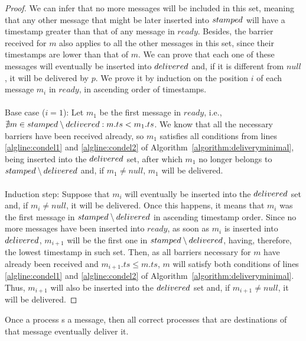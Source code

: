 \documentclass[times, 10pt]{article}
\begin{document}
\begin{proof}
We can infer that no more messages will be included in this set, meaning that any other message that might be later inserted into $stamped$ will have a timestamp greater than that of any message in $ready$. Besides, the barrier received for $m$ also applies to all the other messages in this set, since their timestamps are lower than that of $m$. We can prove that each one of these messages will eventually be inserted into $delivered$ and, if it is different from $null$, it will be delivered by $p$. We prove it by induction on the position $i$ of each message $m_i$ in $ready$, in ascending order of timestamps.\\
\\
\noindent Base case ($i=1$): Let $m_1$ be the first message in $ready$, i.e., \mbox{$\nexists m \in stamped \setminus delivered : m.ts < m_1.ts$}. We know that all the necessary barriers have been received already, so $m_1$ satisfies all conditions from lines \ref{algline:condel1} and \ref{algline:condel2} of \mbox{Algorithm \ref{algorithm:deliveryminimal}}, being inserted into the $delivered$ set, after which $m_1$ no longer belongs to $stamped \setminus delivered$ and, if $m_1 \neq null$, $m_1$ will be delivered.\\
\\
\noindent Induction step: Suppose that $m_{i}$ will eventually be inserted into the $delivered$ set and, if $m_i \neq null$, it will be delivered. Once this happens, it means that $m_{i}$ was the first message in $stamped \setminus delivered$ in ascending timestamp order. Since no more messages have been inserted into $ready$, as soon as $m_{i}$ is inserted into $delivered$, $m_{i+1}$ will be the first one in $stamped \setminus delivered$, having, therefore, the lowest timestamp in such set. Then, as all barriers necessary for $m$ have already been received and $m_{i+1}.ts \leq m.ts$, $m$ will satisfy both conditions of lines \ref{algline:condel1} and \ref{algline:condel2} of \mbox{Algorithm \ref{algorithm:deliveryminimal}}. Thus, $m_{i+1}$ will also be inserted into the $delivered$ set and, if $m_{i+1} \neq null$, it will be delivered.
\end{proof}


\begin{props} \label{props:validity}
Once a process \amcast{}s a message, then all correct processes that are destinations of that message eventually deliver it.
\end{props}
\end{document}
